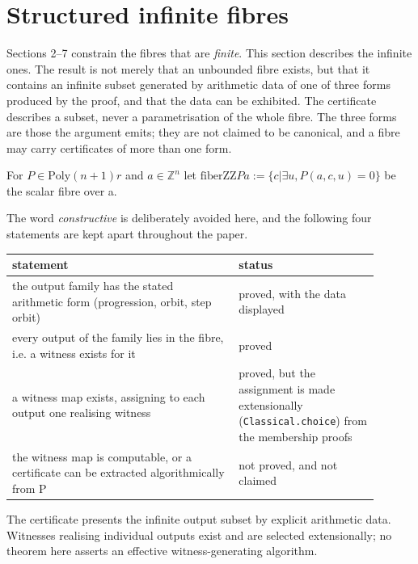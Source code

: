 \section{Structured infinite fibres}\label{sec:8}
Sections 2–7 constrain the fibres that are \emph{finite}. This section describes the infinite ones. The result is not merely that an unbounded fibre exists, but that it contains an infinite subset generated by arithmetic data of one of three forms produced by the proof, and that the data can be exhibited. The certificate describes a subset, never a parametrisation of the whole fibre. The three forms are those the argument emits; they are not claimed to be canonical, and a fibre may carry certificates of more than one form.

For $P ∈ \mathrm{Poly} (n+1) r$ and $a ∈ ℤ^{n}$ let $\mathrm{fiberZZ} P a := \{c | ∃ u, P(a, c, u) = 0\}$ be the scalar fibre over a.

The word \emph{constructive} is deliberately avoided here, and the following four statements are kept apart throughout the paper.

\begin{longtable}{@{}>{\raggedright\arraybackslash}p{0.553\linewidth}>{\raggedright\arraybackslash}p{0.347\linewidth}@{}}
\toprule
statement & status \\
\midrule\endhead
the output family has the stated arithmetic form (progression, orbit, step orbit) & proved, with the data displayed \\
every output of the family lies in the fibre, i.\allowbreak{}e. a witness exists for it & proved \\
a witness map exists, assigning to each output one realising witness & proved, but the assignment is made extensionally (\texttt{Classical.\allowbreak{}choice}) from the membership proofs \\
the witness map is computable, or a certificate can be extracted algorithmically from P & not proved, and not claimed \\
\bottomrule
\end{longtable}
The certificate presents the infinite output subset by explicit arithmetic data. Witnesses realising individual outputs exist and are selected extensionally; no theorem here asserts an effective witness-generating algorithm.

